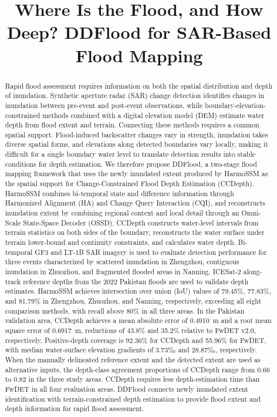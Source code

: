 \documentclass[authoryear,preprint,12pt]{elsarticle}
\begin{document}
\doublespacing
{}
\pagestyle{plain}

\begin{frontmatter}

\title{Where Is the Flood, and How Deep? DDFlood for SAR-Based Flood Mapping}

\author{}

\begin{abstract}

Rapid flood assessment requires information on both the spatial distribution and depth of inundation. Synthetic aperture radar (SAR) change detection identifies changes in inundation between pre-event and post-event observations, while boundary-elevation-constrained methods combined with a digital elevation model (DEM) estimate water depth from flood extent and terrain. Connecting these methods requires a common spatial support. Flood-induced backscatter changes vary in strength, inundation takes diverse spatial forms, and elevations along detected boundaries vary locally, making it difficult for a single boundary water level to translate detection results into stable conditions for depth estimation. We therefore propose DDFlood, a two-stage flood mapping framework that uses the newly inundated extent produced by HarmoSSM as the spatial support for Change-Constrained Flood Depth Estimation (CCDepth). HarmoSSM combines bi-temporal state and difference information through Harmonized Alignment (HA) and Change Query Interaction (CQI), and reconstructs inundation extent by combining regional context and local detail through an Omni-Scale State-Space Decoder (OSSD). CCDepth constructs water-level intervals from terrain statistics on both sides of the boundary, reconstructs the water surface under terrain lower-bound and continuity constraints, and calculates water depth. Bi-temporal GF3 and LT-1B SAR imagery is used to evaluate detection performance for three events characterized by scattered inundation in Zhengzhou, contiguous inundation in Zhuozhou, and fragmented flooded areas in Nanning. ICESat-2 along-track reference depths from the 2022 Pakistan floods are used to validate depth estimates. HarmoSSM achieves intersection over union (IoU) values of 79.45\%, 77.83\%, and 81.79\% in Zhengzhou, Zhuozhou, and Nanning, respectively, exceeding all eight comparison methods, with recall above 80\% in all three areas. In the Pakistan validation area, CCDepth achieves a mean absolute error of 0.4910~m and a root mean square error of 0.6917~m, reductions of 43.8\% and 35.2\% relative to FwDET v2.0, respectively. Positive-depth coverage is 92.36\% for CCDepth and 55.96\% for FwDET, with median water-surface elevation gradients of 3.73‰ and 28.87‰, respectively. When the manually delineated reference extent and the detected extent are used as alternative inputs, the depth-class agreement proportions of CCDepth range from 0.66 to 0.82 in the three study areas. CCDepth requires less depth-estimation time than FwDET in all four evaluation areas. DDFlood connects newly inundated extent identification with terrain-constrained depth estimation to provide flood extent and depth information for rapid flood assessment.


\end{abstract}
\end{frontmatter}
\end{document}
